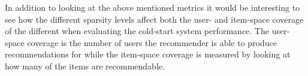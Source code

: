 

In addition to looking at the above mentioned metrics it would be interesting to see how the different sparsity
levels affect both the user- and item-space coverage of the different when evaluating the cold-start system performance.
The user-space coverage is the number of users the recommender is able to produce recommendations for while the item-space
coverage is measured by looking at how many of the items are recommendable.



